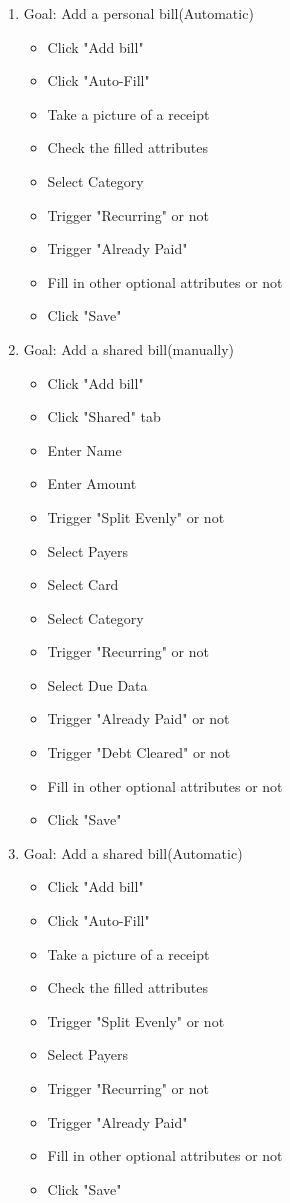 \documentclass{sigchi}
\begin{document}
\begin{enumerate}
    
\item Goal: Add a personal bill(Automatic)
    \begin{itemize}
        \item Click "Add bill"
        \item Click "Auto-Fill"
        \item Take a picture of a receipt
        \item Check the filled attributes
        \item Select Category
        \item Trigger "Recurring" or not
        \item Trigger "Already Paid"
        \item Fill in other optional attributes or not
        \item Click "Save"
    \end{itemize}
    
\item Goal: Add a shared bill(manually)
    \begin{itemize}
        \item Click "Add bill"
        \item Click "Shared" tab
        \item Enter Name
        \item Enter Amount
        \item Trigger "Split Evenly" or not
        \item Select Payers
        \item Select Card
        \item Select Category
        \item Trigger "Recurring" or not
        \item Select Due Data
        \item Trigger "Already Paid" or not
        \item Trigger "Debt Cleared" or not
        \item Fill in other optional attributes or not
        \item Click "Save"
    \end{itemize}
    
\item Goal: Add a shared bill(Automatic)
    \begin{itemize}
        \item Click "Add bill"
        \item Click "Auto-Fill"
        \item Take a picture of a receipt
        \item Check the filled attributes
        \item Trigger "Split Evenly" or not
        \item Select Payers
        \item Trigger "Recurring" or not
        \item Trigger "Already Paid"
        \item Fill in other optional attributes or not
        \item Click "Save"
    \end{itemize}
    


\end{enumerate}
\end{document}
